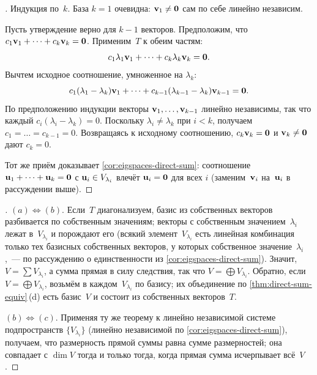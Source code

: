 \begin{proof}[]
Индукция по~$k$. База $k = 1$ очевидна: $\mathbf{v}_1 \neq \mathbf{0}$ сам
по себе линейно независим.

Пусть утверждение верно для $k - 1$ векторов. Предположим, что
$c_1 \mathbf{v}_1 + \dots + c_k \mathbf{v}_k = \mathbf{0}$. Применим~$T$ к
обеим частям:
\[
  c_1 \lambda_1 \mathbf{v}_1 + \dots + c_k \lambda_k \mathbf{v}_k = \mathbf{0}.
\]
Вычтем исходное соотношение, умноженное на $\lambda_k$:
\[
  c_1 (\lambda_1 - \lambda_k) \mathbf{v}_1 + \dots + c_{k-1}(\lambda_{k-1} - \lambda_k) \mathbf{v}_{k-1} = \mathbf{0}.
\]
По предположению индукции векторы $\mathbf{v}_1, \dots, \mathbf{v}_{k-1}$
линейно независимы, так что каждый $c_i (\lambda_i - \lambda_k) = 0$.
Поскольку $\lambda_i \neq \lambda_k$ при $i < k$, получаем
$c_1 = \dots = c_{k-1} = 0$. Возвращаясь к исходному соотношению,
$c_k \mathbf{v}_k = \mathbf{0}$ и $\mathbf{v}_k \neq \mathbf{0}$ дают $c_k = 0$.

Тот же приём доказывает \cref{cor:eigspaces-direct-sum}: соотношение
$\mathbf{u}_1 + \dots + \mathbf{u}_k = \mathbf{0}$ с
$\mathbf{u}_i \in V_{\lambda_i}$ влечёт $\mathbf{u}_i = \mathbf{0}$ для всех
$i$ (заменим~$\mathbf{v}_i$ на~$\mathbf{u}_i$ в рассуждении выше).
\end{proof}

\begin{proof}[]
$(a) \Leftrightarrow (b)$. Если~$T$ диагонализуем, базис из
собственных векторов разбивается по собственным значениям; векторы
с собственным значением~$\lambda_i$ лежат в~$V_{\lambda_i}$ и порождают
его (всякий элемент~$V_{\lambda_i}$ есть линейная комбинация только
тех базисных собственных векторов, у которых собственное
значение~$\lambda_i$,~--- по рассуждению о единственности из
\cref{cor:eigspaces-direct-sum}). Значит, $V = \sum V_{\lambda_i}$, а
сумма прямая в силу следствия, так что
$V = \bigoplus V_{\lambda_i}$. Обратно, если $V = \bigoplus V_{\lambda_i}$,
возьмём в каждом~$V_{\lambda_i}$ по базису; их объединение по
\cref{thm:direct-sum-equiv}\,(d) есть базис~$V$ и состоит из
собственных векторов~$T$.

$(b) \Leftrightarrow (c)$. Применяя ту же теорему к линейно независимой
системе подпространств $\{V_{\lambda_i}\}$ (линейно независимой по
\cref{cor:eigspaces-direct-sum}), получаем, что размерность прямой
суммы равна сумме размерностей; она совпадает с $\dim V$ тогда и
только тогда, когда прямая сумма исчерпывает всё~$V$.
\end{proof}


